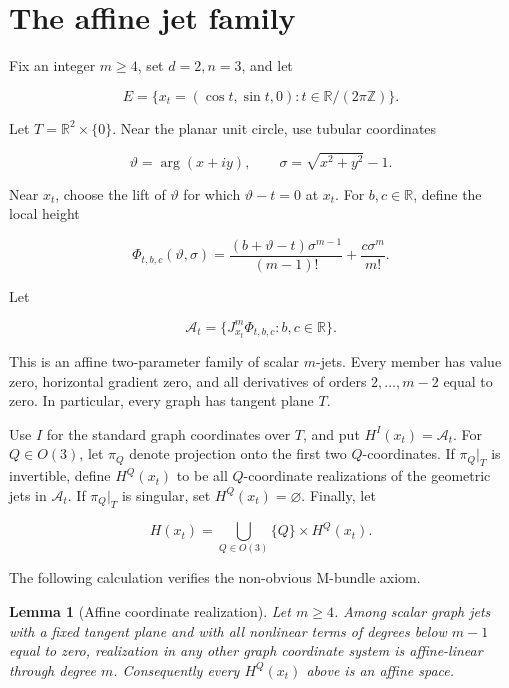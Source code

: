 \documentclass[11pt]{article}
\newtheorem{lemma}{Lemma}
\newcommand{\R}{\mathbb R}
\newcommand{\cA}{\mathcal A}
\begin{document}
\section{The affine jet family}

Fix an integer \(m\ge4\), set \(d=2,n=3\), and let

\[
 E=\{x_t=(\cos t,\sin t,0):t\in\R/(2\pi\mathbb Z)\}.
\]

Let \(T=\R^2\times\{0\}\). Near the planar unit circle, use tubular
coordinates

\[
 \vartheta=\arg(x+iy),\qquad
 \sigma=\sqrt{x^2+y^2}-1.
\]

Near \(x_t\), choose the lift of \(\vartheta\) for which
\(\vartheta-t=0\) at \(x_t\). For \(b,c\in\R\), define the local height

\begin{equation}\label{eq:local-model}
 \Phi_{t,b,c}(\vartheta,\sigma)
 =\frac{(b+\vartheta-t)\sigma^{m-1}}{(m-1)!}
  +\frac{c\sigma^m}{m!}.
\end{equation}

Let

\[
 \cA_t=\{J^m_{x_t}\Phi_{t,b,c}:b,c\in\R\}.
\]

This is an affine two-parameter family of scalar \(m\)-jets. Every member
has value zero, horizontal gradient zero, and all derivatives of orders
\(2,\ldots,m-2\) equal to zero. In particular, every graph has tangent plane
\(T\).

Use \(I\) for the standard graph coordinates over \(T\), and put
\(H^I(x_t)=\cA_t\). For \(Q\in O(3)\), let \(\pi_Q\) denote projection onto
the first two \(Q\)-coordinates. If \(\pi_Q|_T\) is invertible, define
\(H^Q(x_t)\) to be all \(Q\)-coordinate realizations of the geometric jets
in \(\cA_t\). If \(\pi_Q|_T\) is singular, set \(H^Q(x_t)=\varnothing\).
Finally, let

\[
 H(x_t)=\bigcup_{Q\in O(3)}\{Q\}\times H^Q(x_t).
\]

The following calculation verifies the non-obvious M-bundle axiom.

\begin{lemma}[Affine coordinate realization]\label{lem:affine}
Let \(m\ge4\). Among scalar graph jets with a fixed tangent plane and with
all nonlinear terms of degrees below \(m-1\) equal to zero, realization in
any other graph coordinate system is affine-linear through degree \(m\).
Consequently every \(H^Q(x_t)\) above is an affine space.
\end{lemma}
\end{document}
